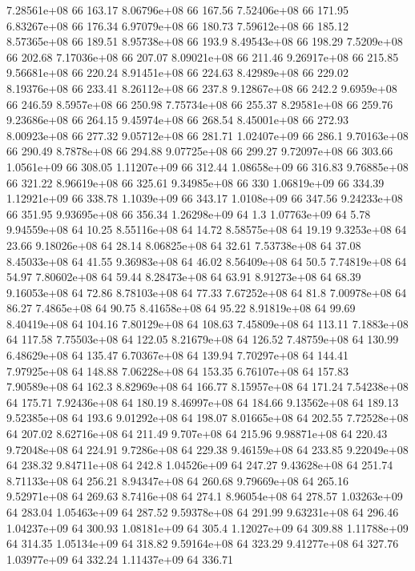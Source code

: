 7.28561e+08 66 163.17
8.06796e+08 66 167.56
7.52406e+08 66 171.95
6.83267e+08 66 176.34
6.97079e+08 66 180.73
7.59612e+08 66 185.12
8.57365e+08 66 189.51
8.95738e+08 66 193.9
8.49543e+08 66 198.29
7.5209e+08 66 202.68
7.17036e+08 66 207.07
8.09021e+08 66 211.46
9.26917e+08 66 215.85
9.56681e+08 66 220.24
8.91451e+08 66 224.63
8.42989e+08 66 229.02
8.19376e+08 66 233.41
8.26112e+08 66 237.8
9.12867e+08 66 242.2
9.6959e+08 66 246.59
8.5957e+08 66 250.98
7.75734e+08 66 255.37
8.29581e+08 66 259.76
9.23686e+08 66 264.15
9.45974e+08 66 268.54
8.45001e+08 66 272.93
8.00923e+08 66 277.32
9.05712e+08 66 281.71
1.02407e+09 66 286.1
9.70163e+08 66 290.49
8.7878e+08 66 294.88
9.07725e+08 66 299.27
9.72097e+08 66 303.66
1.0561e+09 66 308.05
1.11207e+09 66 312.44
1.08658e+09 66 316.83
9.76885e+08 66 321.22
8.96619e+08 66 325.61
9.34985e+08 66 330
1.06819e+09 66 334.39
1.12921e+09 66 338.78
1.1039e+09 66 343.17
1.0108e+09 66 347.56
9.24233e+08 66 351.95
9.93695e+08 66 356.34
1.26298e+09 64 1.3
1.07763e+09 64 5.78
9.94559e+08 64 10.25
8.55116e+08 64 14.72
8.58575e+08 64 19.19
9.3253e+08 64 23.66
9.18026e+08 64 28.14
8.06825e+08 64 32.61
7.53738e+08 64 37.08
8.45033e+08 64 41.55
9.36983e+08 64 46.02
8.56409e+08 64 50.5
7.74819e+08 64 54.97
7.80602e+08 64 59.44
8.28473e+08 64 63.91
8.91273e+08 64 68.39
9.16053e+08 64 72.86
8.78103e+08 64 77.33
7.67252e+08 64 81.8
7.00978e+08 64 86.27
7.4865e+08 64 90.75
8.41658e+08 64 95.22
8.91819e+08 64 99.69
8.40419e+08 64 104.16
7.80129e+08 64 108.63
7.45809e+08 64 113.11
7.1883e+08 64 117.58
7.75503e+08 64 122.05
8.21679e+08 64 126.52
7.48759e+08 64 130.99
6.48629e+08 64 135.47
6.70367e+08 64 139.94
7.70297e+08 64 144.41
7.97925e+08 64 148.88
7.06228e+08 64 153.35
6.76107e+08 64 157.83
7.90589e+08 64 162.3
8.82969e+08 64 166.77
8.15957e+08 64 171.24
7.54238e+08 64 175.71
7.92436e+08 64 180.19
8.46997e+08 64 184.66
9.13562e+08 64 189.13
9.52385e+08 64 193.6
9.01292e+08 64 198.07
8.01665e+08 64 202.55
7.72528e+08 64 207.02
8.62716e+08 64 211.49
9.707e+08 64 215.96
9.98871e+08 64 220.43
9.72048e+08 64 224.91
9.7286e+08 64 229.38
9.46159e+08 64 233.85
9.22049e+08 64 238.32
9.84711e+08 64 242.8
1.04526e+09 64 247.27
9.43628e+08 64 251.74
8.71133e+08 64 256.21
8.94347e+08 64 260.68
9.79669e+08 64 265.16
9.52971e+08 64 269.63
8.7416e+08 64 274.1
8.96054e+08 64 278.57
1.03263e+09 64 283.04
1.05463e+09 64 287.52
9.59378e+08 64 291.99
9.63231e+08 64 296.46
1.04237e+09 64 300.93
1.08181e+09 64 305.4
1.12027e+09 64 309.88
1.11788e+09 64 314.35
1.05134e+09 64 318.82
9.59164e+08 64 323.29
9.41277e+08 64 327.76
1.03977e+09 64 332.24
1.11437e+09 64 336.71
